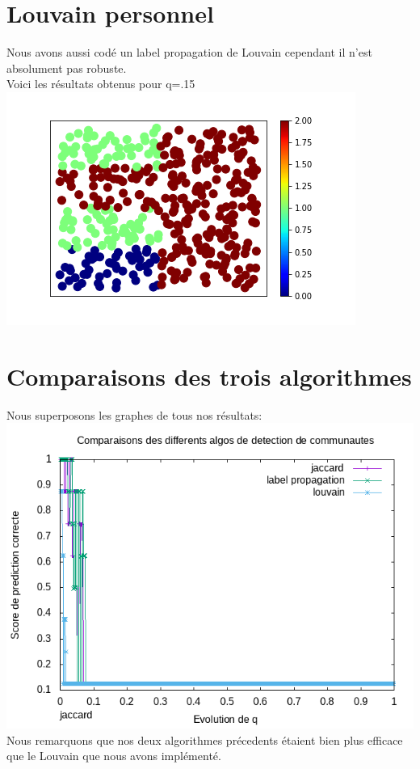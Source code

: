 \documentclass[a4paper,10pt]{report}
\begin{document}
\section{Louvain personnel}
Nous avons aussi codé un label propagation de Louvain cependant il n'est absolument pas robuste.
\\
Voici les résultats obtenus pour q=.15
\\
\includegraphics[scale=0.6]{./Datas/colorLouvain015.png}
\section{Comparaisons des trois algorithmes}
Nous superposons les graphes de tous nos résultats:
\\
\includegraphics[scale=0.6]{./Datas/compareDetectionsAlgos.png}
Nous remarquons que nos deux algorithmes précedents étaient bien plus efficace que le Louvain que nous avons implémenté.
\\
\end{document}
